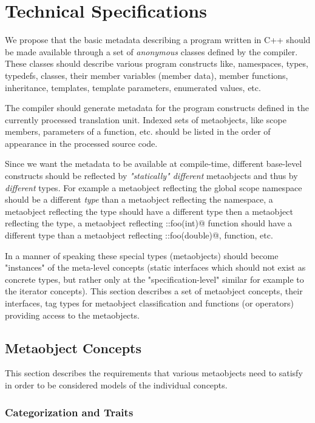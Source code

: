 \section{Technical Specifications}

We propose that the basic metadata describing a program written
in C++ should be made available through a set of {\em anonymous} classes
defined by the compiler. These classes should describe various program
constructs like, namespaces, types, typedefs, classes, their member variables
(member data), member functions, inheritance, templates, template parameters,
enumerated values, etc.

The compiler should generate metadata for the program constructs defined
in the currently processed translation unit. Indexed sets of metaobjects,
like scope members, parameters of a function, etc. should be listed
in the order of appearance in the processed source code.

Since we want the metadata to be available at compile-time,
different base-level constructs should be reflected by
{\em "statically" different} metaobjects and thus by {\em different} types.
For example a metaobject reflecting the global scope namespace should
be a different {\em type} than a metaobject reflecting the \verb@std@
namespace, a metaobject reflecting the \verb@int@ type should
have a different type then a metaobject reflecting the \verb@double@
type, a metaobject reflecting \verb@::foo(int)@ function should
have a different type than a metaobject reflecting \verb@::foo(double)@,
function, etc.

In a manner of speaking these special types (metaobjects) should become
"instances" of the meta-level concepts (static interfaces which
should not exist as concrete types, but rather only at the
"specification-level" similar for example to the iterator concepts).
This section describes a set of metaobject concepts,
their interfaces, tag types for metaobject classification and
functions (or operators) providing access to the metaobjects.

\subsection{Metaobject Concepts}

This section describes the requirements that various metaobjects
need to satisfy in order to be considered models of the individual
concepts.

\subsubsection{Categorization and Traits}

